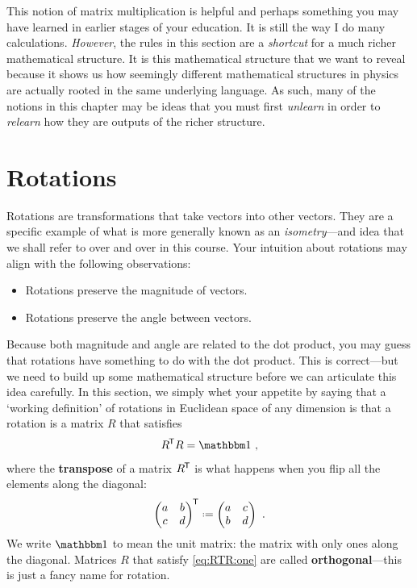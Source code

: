 \documentclass[12pt, oneside]{report}    %
\let\oldsection\section
\def\section{%
  \setcounter{sidenote}{1}%
  \oldsection
}
\begin{document}
This notion of matrix multiplication is helpful and perhaps something you may have learned in earlier stages of your education. It is still the way I do many calculations. \emph{However}, the rules in this section are a \emph{shortcut} for a much richer mathematical structure. It is this mathematical structure that we want to reveal because it shows us how seemingly different mathematical structures in physics are actually rooted in the same underlying language. As such, many of the notions in this chapter may be ideas that you must first \emph{unlearn} in order to \emph{relearn} how they are outputs of the richer structure.


\section{Rotations}\label{sec:Euclidean:three:space:rotations}

Rotations are transformations that take vectors into other vectors. They are a specific example of what is more generally known as an \emph{isometry}---and idea that we shall refer to over and over in this course. Your intuition about rotations may align with the following observations:
\begin{itemize}
    \item Rotations preserve the magnitude of vectors.
    \item Rotations preserve the angle between vectors. 
\end{itemize}
Because both magnitude and angle are related to the dot product, you may guess that rotations have something to do with the dot product. This is correct---but we need to build up some mathematical structure before we can articulate this idea carefully. In this section, we simply whet your appetite by saying that a `working definition' of rotations in Euclidean space of any dimension is that a rotation is a matrix $R$ that satisfies
\begin{align}
    R^\trans R = \one \ ,
    \label{eq:RTR:one}
\end{align}
where the \textbf{transpose} of a matrix $R^{\mkern-1.5mu\mathsf{T}}$ is what happens when you flip all the elements along the diagonal:
\begin{align}
    \begin{pmatrix}
        a & b \\
        c & d
    \end{pmatrix}^\trans \defeq
    \begin{pmatrix}
        a & c \\
        b & d
    \end{pmatrix} \ .
\end{align}
We write $\one$ to mean the unit matrix: the matrix with only ones along the diagonal. Matrices $R$ that satisfy \eqref{eq:RTR:one} are called \textbf{orthogonal}---this is just a fancy name for rotation. 
\end{document}
